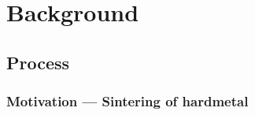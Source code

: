 \documentclass[11pt]{beamer} %
\begin{document}
\section{Background}
\subsection{Process}
\begin{frame}
 \frametitle{Motivation --- Sintering of hardmetal}



\end{frame}
\end{document}
